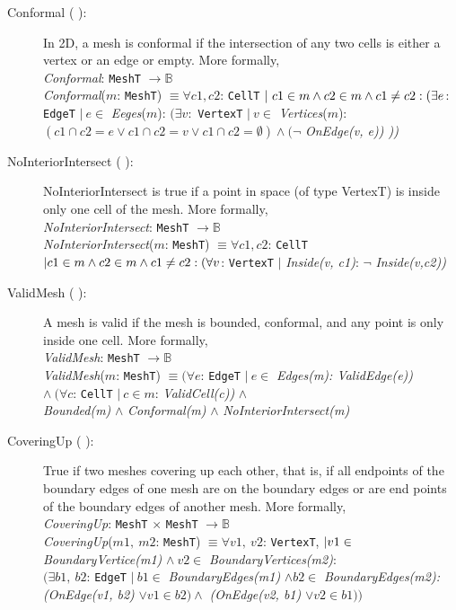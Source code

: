 \documentclass[12pt,titlepage]{article}
\begin{document}
\begin{description}
\item [Conformal ( \dtheddnum \label{dConformal}):] In 2D, a mesh is conformal if the intersection of any two cells is either a vertex or an edge or empty. More formally,\\
{\it Conformal}: {\tt MeshT} $\rightarrow \mathbb{B}$\\
{\it Conformal}($m$: {\tt MeshT}) $\equiv \forall c1, c2$: {\tt CellT} $|\ c1\in m \wedge c2\in m \wedge c1\neq c2 : \\
(\exists e$: {\tt EdgeT} $|\ e\in$ {\it Eeges}($m$): $(\exists v:$ {\tt VertexT} $|\ v\in$ {\it Vertices}($m$):\\
$(c1\cap c2 = e \vee c1\cap c2 = v \vee c1\cap c2 = \emptyset) \wedge (\neg$ {\it OnEdge(v, e))  ))}

\item [NoInteriorIntersect ( \dtheddnum \label{dNoInteriorIntersect}):] NoInteriorIntersect is true if a point in space (of type VertexT) is inside only one cell of the mesh. More formally,\\
{\it NoInteriorIntersect}: {\tt MeshT} $\rightarrow \mathbb{B}$\\
{\it NoInteriorIntersect}($m$: {\tt MeshT}) $\equiv \forall c1, c2$: {\tt CellT} $|\\ c1\in m \wedge c2\in m \wedge c1 \neq c2:
 (\forall v$: {\tt VertexT} $|$ {\it Inside(v, c1)}: $\neg$ {\it Inside(v,c2))}

\item [ValidMesh ( \dtheddnum \label{dValidMesh}):] A mesh is valid if the mesh is bounded, conformal, and any point is only inside one cell. More formally, \\
{\it ValidMesh}: {\tt MeshT} $\rightarrow \mathbb{B}$\\
{\it ValidMesh}($m$: {\tt MeshT}) $\equiv (\forall e$: {\tt EdgeT} $|\ e\in$ {\it Edges(m): ValidEdge(e))} \\
$\wedge\ (\forall c$: {\tt CellT} $|\ c\in m$: {\it ValidCell(c))} $\wedge$\\
{\it Bounded(m)} $\wedge$ {\it Conformal(m)} $\wedge$ {\it NoInteriorIntersect(m)} 

\item [CoveringUp ( \dtheddnum \label{dCoveringUp}):] True if two meshes covering up each other, that is, if all endpoints of the boundary edges of one mesh are on the boundary edges or are end points of the boundary edges of another mesh. More formally, \\
{\it CoveringUp}: {\tt MeshT} $\times$ {\tt MeshT} $\rightarrow \mathbb{B}$\\
{\it CoveringUp}($m1,\ m2$: {\tt MeshT}) $\equiv \forall v1,\ v2$: {\tt VertexT}, $| \\
 v1 \in$ {\it BoundaryVertice(m1)} $\wedge\ v2\in$ {\it BoundaryVertices(m2)}: \\
 $(\exists b1,\ b2$: {\tt EdgeT} $|\ b1\in$ {\it BoundaryEdges(m1)} $\wedge b2\in$ {\it BoundaryEdges(m2):
 (OnEdge(v1, b2)} $\vee v1\in b2) \wedge$ {\it (OnEdge(v2, b1)} $\vee v2\in b1))$


\end{description}
\end{document}
